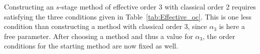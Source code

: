 


\begin{example}\label{ex:Effective_RK32}
	Constructing an $s$-stage method of effective order 3 with classical order 2 requires satisfying the three conditions given in Table~\ref{tab:Effective_oc}. This is one less condition than constructing a method with classical order 3, since $\alpha_3$ is here a free parameter. After choosing a method and thus a value for $\alpha_3$, the order conditions for the starting method are now fixed as well.
\end{example}


